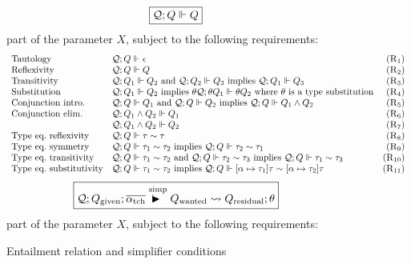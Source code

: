 \documentclass[a4paper]{jfp}
\begin{document}
\begin{figure}
	\caption{Entailment relation and simplifier conditions}
   \begin{displaymath}
		\text{\framebox{$ \mathcal{Q};Q \Vdash Q $}} 
   \end{displaymath}
     part of the parameter $X$, subject to the following requirements:
   	\begin{displaymath}
         \begin{array}{llr}
            \text{Tautology} &    \mathcal{Q};Q \Vdash \epsilon & (\textsc{R}_1) \\
            \text{Reflexivity} &  \mathcal{Q};Q \Vdash Q & (\textsc{R}_2) \\
            \text{Transitivity} & \mathcal{Q};Q_1 \Vdash Q_2\ \text{and}\ \mathcal{Q};Q_2 \Vdash Q_3\ 
                                                              \text{implies}\ \mathcal{Q};Q_1 \Vdash Q_3  & (\textsc{R}_3) \\
            \text{Substitution}   & \mathcal{Q};Q_1 \Vdash Q_2\ \text{implies}\ \theta\mathcal{Q};\theta Q_1 \Vdash \theta Q_2\ \text{where $\theta$ 
               is a type substitution} & (\textsc{R}_4) \\
            \text{Conjunction intro.} & \mathcal{Q};Q \Vdash Q_1\ \text{and}\ \mathcal{Q};Q \Vdash Q_2\ 
                                                                  \text{implies}\ \mathcal{Q};Q \Vdash Q_1 \land Q_2 & (\textsc{R}_5)\\
            \text{Conjunction elim.}   & \mathcal{Q};Q_1 \land Q_2 \Vdash Q_1 & (\textsc{R}_6)              \\
                                       & \mathcal{Q};Q_1 \land Q_2 \Vdash Q_2 & (\textsc{R}_7)             \\
            \text{Type eq.\ reflexivity} & \mathcal{Q};Q \Vdash \tau \sim \tau & (\textsc{R}_8) \\
            \text{Type eq.\ symmetry}    & \mathcal{Q};Q \Vdash \tau_1 \sim \tau_2\ \text{implies}\ \mathcal{Q};Q \Vdash \tau_2 \sim \tau_1 
                                         & (\textsc{R}_9) \\
            \text{Type eq.\ transitivity} &  \mathcal{Q};Q \Vdash \tau_1 \sim \tau_2\ \text{and}\ \mathcal{Q};Q \Vdash \tau_2 \sim \tau_3\
            \text{implies}\ \mathcal{Q};Q \Vdash \tau_1 \sim \tau_3 & (\textsc{R}_{10}) \\
            \text{Type eq.\ substitutivity} & \mathcal{Q};Q \Vdash \tau_1 \sim \tau_2\ \text{implies}\ \mathcal{Q};Q \Vdash [\alpha \mapsto \tau_1]
            \tau \sim [\alpha \mapsto \tau_2] \tau & (\textsc{R}_{11})\\
         \end{array}
	\end{displaymath}
   \begin{displaymath}
		\text{\framebox{$ \mathcal{Q};Q_{\text{given}}; \overline{\alpha_\text{tch}} \stackrel{\text{simp}}{\vdasharrow} Q_{\text{wanted}} \leadsto Q_{\text{residual}};\theta  $}} 
   \end{displaymath}
     part of the parameter $X$, subject to the following requirements:


\end{figure}
\end{document}
